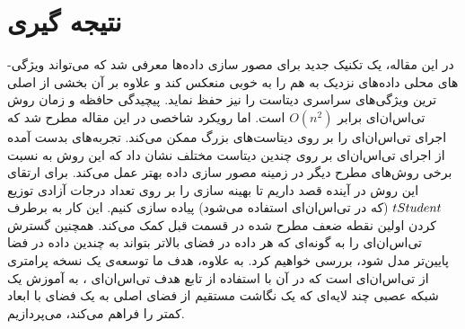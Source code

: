 \section{نتیجه گیری}
در این مقاله، یک تکنیک جدید برای مصور سازی داده‌ها معرفی شد که می‌تواند ویژگی-های محلی داده‌های نزدیک به هم را به خوبی منعکس کند و علاوه بر آن بخشی از اصلی ترین ویژگی‌های سراسری دیتاست را نیز حفظ نماید. پیچیدگی حافظه و زمان روش تی‌اس‌ان‌ای برابر $O(n^2)$ است. اما رویکرد شاخصی در این مقاله مطرح شد که اجرای تی‌اس‌ان‌ای را بر روی دیتاست‌های بزرگ ممکن می‌کند. تجربه‌های بدست آمده از اجرای تی‌اس‌ان‌ای بر روی چندین دیتاست مختلف نشان داد که این روش به نسبت برخی روش‌های مطرح دیگر در زمینه مصور سازی داده بهتر عمل می‌کند.
برای ارتقای این روش در آینده قصد داریم تا بهینه سازی را بر روی تعداد درجات آزادی توزیع $t\-Student$ (که در تی‌اس‌ان‌ای استفاده می‌شود) پیاده سازی کنیم. این کار به برطرف کردن اولین نقطه ضعف مطرح شده در قسمت قبل کمک می‌کند. همچنین گسترش تی‌اس‌ان‌ای را به گونه‌ای که هر داده در فضای بالاتر بتواند به چندین داده در فضا پایین‌تر مدل شود، بررسی خواهیم کرد.  به علاوه، هدف ما توسعه‌ی یک نسخه پرامتری از تی‌اس‌ان‌ای است که در آن با استفاده از تابع هدف تی‌اس‌ان‌ای ، به آموزش یک شبکه عصبی چند لایه‌ای که یک نگاشت مستقیم از فضای اصلی به یک فضای با ابعاد کمتر را فراهم می‌کند، می‌پردازیم. 

